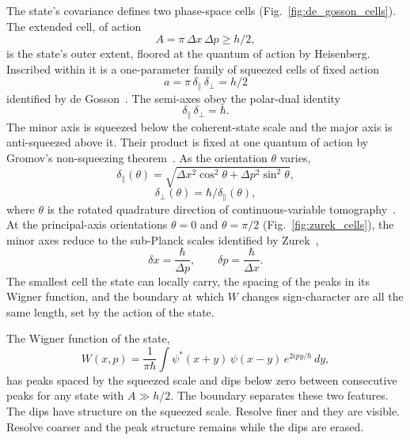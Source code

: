 \documentclass[%
  aps, reprint, pra, amsmath,amssymb
]{revtex4-2}
\begin{document}
The state's covariance defines two phase-space cells (Fig.~\ref{fig:de_gosson_cells}). The extended cell, of action
\begin{equation}
A = \pi\,\Delta x\,\Delta p \ge h/2,
\label{eq:extended_cell}
\end{equation}
is the state's outer extent, floored at the quantum of action by Heisenberg. Inscribed within it is a one-parameter family of squeezed cells of fixed action
\begin{equation}
a = \pi\,\delta_\parallel\,\delta_\perp = h/2
\label{eq:squeezed_cell}
\end{equation}
identified by de Gosson~\cite{degosson2013qblobs,degossoncharlyne2022}. The semi-axes obey the polar-dual identity
\begin{equation}
\delta_\parallel\,\delta_\perp = \hbar.
\label{eq:polar_dual}
\end{equation}
The minor axis is squeezed below the coherent-state scale and the major axis is anti-squeezed above it. Their product is fixed at one quantum of action by Gromov's non-squeezing theorem~\cite{gromov1985}. As the orientation $\theta$ varies,
\begin{equation}
\delta_\parallel(\theta) = \sqrt{\Delta x^2\cos^2\theta + \Delta p^2\sin^2\theta},
\label{eq:delta_parallel}
\end{equation}
\begin{equation}
\delta_\perp(\theta) = \hbar / \delta_\parallel(\theta),
\label{eq:delta_perp}
\end{equation}
where $\theta$ is the rotated quadrature direction of continuous-variable tomography~\cite{vogelrisken1989,lvovsky2009}. At the principal-axis orientations $\theta = 0$ and $\theta = \pi/2$ (Fig.~\ref{fig:zurek_cells}), the minor axes reduce to the sub-Planck scales identified by Zurek~\cite{zurek2001},
\begin{equation}
\delta x = \frac{\hbar}{\Delta p}, \qquad \delta p = \frac{\hbar}{\Delta x}.
\label{eq:zurek}
\end{equation}
The smallest cell the state can locally carry, the spacing of the peaks in its Wigner function, and the boundary at which $W$ changes sign-character are all the same length, set by the action of the state.

    
    The Wigner function of the state,
    \begin{equation}
    W(x,p) = \frac{1}{\pi\hbar}\int \psi^*(x+y)\,\psi(x-y)\,e^{2ipy/\hbar}\,dy,
    \label{eq:wigner}
    \end{equation}
    has peaks spaced by the squeezed scale and dips below zero between consecutive peaks for any state with $A \gg h/2$. The boundary separates these two features. The dips have structure on the squeezed scale. Resolve finer and they are visible. Resolve coarser and the peak structure remains while the dips are erased.
    
\end{document}
